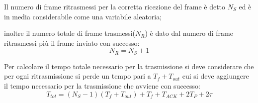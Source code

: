 Il numero di frame ritrasmessi per la corretta ricezione del frame è detto $N_S$ ed è in media considerabile come una variabile aleatoria;

inoltre il numero totale di frame trasmessi($N_R$) è dato dal numero di frame ritrasmessi più il frame inviato con successo:
\begin{equation}
N_R = N_S + 1
\end{equation}

Per calcolare il tempo totale necessario per la trasmissione
si deve considerare che per ogni ritrasmissione si perde un
tempo pari a $T_f+T_{out}$ cui si deve aggiungere il tempo
necessario per la trasmissione che avviene con successo:
\begin{equation}
T_{tot} = (N_S - 1)(T_f + T_{out}) + T_f + T_{ACK} + 2T_P + 2\tau
\end{equation}
\newpage

